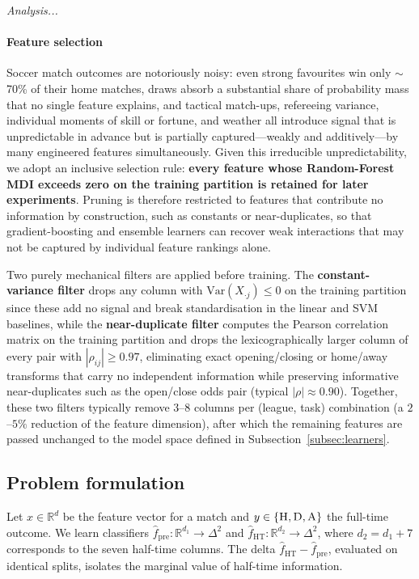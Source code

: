 \documentclass[pdflatex,sn-mathphys-num]{sn-jnl}
\theoremstyle{thmstyleone}
\theoremstyle{thmstyletwo}
\theoremstyle{thmstylethree}
\begin{document}
\textit{Analysis...}

\paragraph{Feature selection}\label{subsec:fi-selection}

Soccer match outcomes are notoriously noisy: even strong favourites
win only $\sim$70\% of their home matches, draws absorb a substantial
share of probability mass that no single feature explains, and
tactical match-ups, refereeing variance, individual moments of skill
or fortune, and weather all introduce signal that is unpredictable in
advance but is partially captured---weakly and additively---by many
engineered features simultaneously. Given this irreducible
unpredictability, we adopt an inclusive selection rule: \textbf{every
feature whose Random-Forest MDI exceeds zero on the training partition
is retained for later experiments}. Pruning is therefore restricted
to features that contribute no information by construction, such as
constants or near-duplicates, so that gradient-boosting and ensemble
learners can recover weak interactions that may not be captured by
individual feature rankings alone.

Two purely mechanical filters are applied before training. The
\textbf{constant-variance filter} drops any column with
$\mathrm{Var}(X_{\cdot j})\le 0$ on the training partition since
these add no signal and break standardisation in the linear and SVM
baselines, while the \textbf{near-duplicate filter} computes the
Pearson correlation matrix on the training partition and drops the
lexicographically larger column of every pair with
$|\rho_{ij}|\ge 0.97$, eliminating exact opening/closing or
home/away transforms that carry no independent information while
preserving informative near-duplicates such as the open/close odds
pair (typical $|\rho|\approx 0.90$). Together, these two filters
typically remove $3$--$8$ columns per (league, task) combination
(a $2$--$5\%$ reduction of the feature dimension), after which the
remaining features are passed unchanged to the model space defined
in Subsection~\ref{subsec:learners}.



\subsection{Problem formulation}
Let $x \in \mathbb{R}^{d}$ be the feature vector for a match and
$y \in \{\textsc{H},\textsc{D},\textsc{A}\}$ the full-time outcome. We
learn classifiers
$\hat{f}_{\text{pre}}: \mathbb{R}^{d_1} \to \Delta^{2}$ and
$\hat{f}_{\text{HT}}: \mathbb{R}^{d_2} \to \Delta^{2}$, where
$d_2 = d_1 + 7$ corresponds to the seven half-time columns. The
delta $\hat{f}_{\text{HT}} - \hat{f}_{\text{pre}}$, evaluated on
identical splits, isolates the marginal value of half-time
information.
\end{document}
